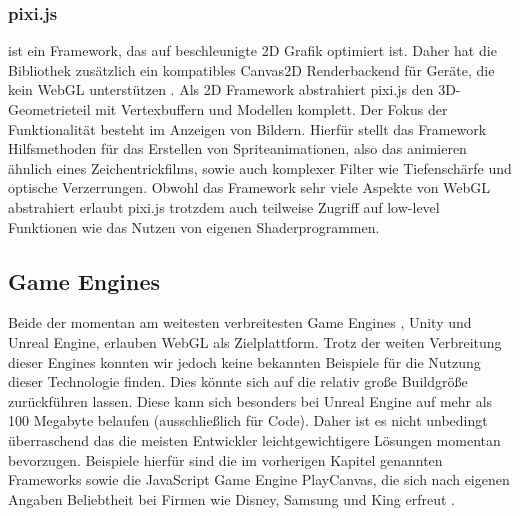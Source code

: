 \subsubsection*{pixi.js} ist ein Framework, das auf beschleunigte 2D Grafik optimiert ist. Daher hat die Bibliothek zusätzlich ein kompatibles Canvas2D Renderbackend für Geräte, die kein WebGL unterstützen \cite{pixiGithub}. Als 2D Framework abstrahiert pixi.js den 3D-Geometrieteil mit Vertexbuffern und Modellen komplett. Der Fokus der Funktionalität besteht im Anzeigen von Bildern. Hierfür stellt das Framework Hilfsmethoden für das Erstellen von Spriteanimationen, also das animieren ähnlich eines Zeichentrickfilms, sowie auch komplexer Filter wie Tiefenschärfe und optische Verzerrungen. Obwohl das Framework sehr viele Aspekte von WebGL abstrahiert erlaubt pixi.js trotzdem auch teilweise Zugriff auf low-level Funktionen wie das Nutzen von eigenen Shaderprogrammen.
\subsection{Game Engines}
Beide der momentan am weitesten verbreitesten Game Engines \cite{UnityDist}\cite{EngineDist}, Unity und Unreal Engine, erlauben WebGL als Zielplattform. Trotz der weiten Verbreitung dieser Engines konnten wir jedoch keine bekannten Beispiele für die Nutzung dieser Technologie finden. Dies könnte sich auf die relativ große Buildgröße zurückführen lassen. Diese kann sich besonders bei Unreal Engine auf mehr als 100 Megabyte belaufen (ausschließlich für Code). Daher ist es nicht unbedingt überraschend das die meisten Entwickler leichtgewichtigere Lösungen momentan bevorzugen. Beispiele hierfür sind die im vorherigen Kapitel genannten Frameworks sowie die JavaScript Game Engine PlayCanvas, die sich nach eigenen Angaben Beliebtheit bei Firmen wie Disney, Samsung und King erfreut \cite{playCanGithub}.
